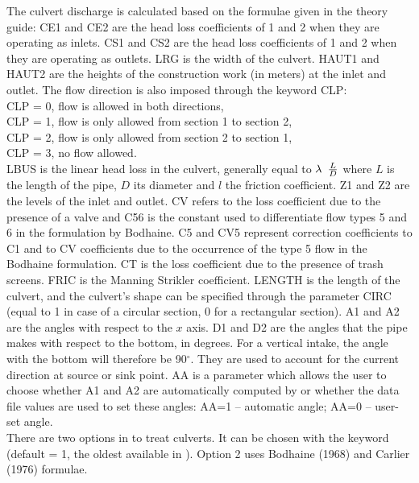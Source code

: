 The culvert discharge is calculated based on the formulae given
in the  theory guide:
CE1 and CE2 are the head loss coefficients of 1 and 2 when they are operating as inlets. 
CS1 and CS2 are the head loss coefficients of 1 and 2 when they are operating as outlets. 
LRG is the width of the culvert.
HAUT1 and HAUT2 are the heights of the construction work (in meters) at the inlet and outlet.
The flow direction is also imposed through the keyword CLP:\\
CLP = 0, flow is allowed in both directions,\\
CLP = 1, flow is only allowed from section 1 to section 2,\\
CLP = 2, flow is only allowed from section 2 to section 1,\\
CLP = 3, no flow allowed.\\
LBUS is the linear head loss in the culvert, generally equal to
$\lambda {\kern 1pt} {\kern 1pt} {\kern 1pt} {\kern 1pt} {\kern 1pt} \frac{L}{D} $
where $L$ is the length of the pipe, $D$ its diameter and $l$ the friction coefficient.
Z1 and Z2 are the levels of the inlet and outlet.
CV refers to the loss coefficient due to the presence of a valve and
C56 is the constant used to differentiate flow types 5 and 6 in the formulation by Bodhaine.
C5 and CV5 represent correction coefficients to C1 and to CV coefficients 
due to the occurrence of the type 5 flow in the Bodhaine formulation.
CT is the loss coefficient due to the presence of trash screens.
FRIC is the Manning Strikler coefficient.
LENGTH is the length of the culvert, and the culvert's shape can be specified through the parameter CIRC (equal to 1 in 
case of a circular section, 0 for a rectangular section).
A1 and A2 are the angles with respect to the $x$ axis. 
D1 and D2 are the angles that the pipe makes with respect to the bottom, in degrees. 
For a vertical intake, the angle with the bottom will therefore be 90${}^\circ$.
They are used to account for the current direction at source or sink point.
AA is a parameter which allows the user to choose whether A1 and A2 are automatically
computed by 
or whether the data file values are used to set these angles: AA=1 -- automatic angle; AA=0 -- user-set angle.\\

There are two options in  to treat culverts.
It can be chosen with the  keyword
(default = 1, the oldest available in \tel).
Option 2 uses Bodhaine (1968) and Carlier (1976) formulae.
